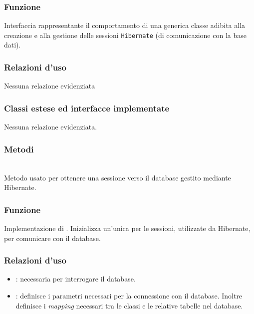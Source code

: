 
\subsubsection*{Funzione}
Interfaccia rappresentante il comportamento di una generica classe adibita alla creazione e alla gestione delle sessioni \texttt{Hibernate} (di comunicazione con la base dati).

\subsubsection*{Relazioni d'uso}

Nessuna relazione evidenziata

\subsubsection*{Classi estese ed interfacce implementate}

Nessuna relazione evidenziata.


\subsubsection*{Metodi}
\begin{description}

	\item{}\\
	Metodo usato per ottenere una sessione verso il database gestito mediante Hibernate.
	
\end{description}


\subsubsection*{Funzione}
Implementazione di . Inizializza un'unica  per le sessioni, utilizzate da Hibernate, per comunicare con il database.

\subsubsection*{Relazioni d'uso}

\begin{itemize}
	\item {}: necessaria per interrogare il database.
	\item {}: definisce i parametri necessari per la connessione con il database. Inoltre definisce i \textit{mapping} necessari tra le classi  e le relative tabelle nel database.
\end{itemize}

